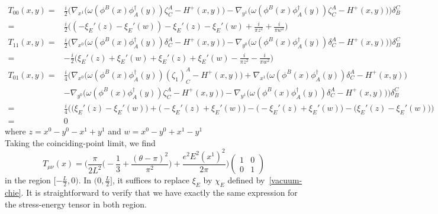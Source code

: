 \begin{equation}\label{vacuum-stressenergy}
\begin{split}
T_{00}(x,y) = 
& \frac{i}{2}\Big(\nabla_{x^1} \big( \omega(\phi^B(x) \phi^\dagger_A(y))\zeta^A_C - H^+(x,y) \big)
- \nabla_{y^1} \big( \omega( \phi^B(x) \phi^\dagger_A(y))\zeta^A_C - H^+(x,y) \big)
\Big)\delta_B^C  \\
= & \frac{i}{2} \big( (-\xi_E'(z) - \xi_E'(w)) - \xi_E'(z) - \xi_E'(w) + \frac{i}{\pi z^2} + \frac{i}{\pi w^2} \big)   \\
T_{11}(x,y) =
& \frac{i}{2}\Big(\nabla_{x^0} \big( \omega(\phi^B(x) \phi^\dagger_A(y))\delta^A_C - H^+(x,y) \big)
- \nabla_{y^0} \big( \omega( \phi^B(x) \phi^\dagger_A(y))\delta^A_C - H^+(x,y) \big)
\Big)\delta_B^C  \\
= & - \frac{i}{2}\big( \xi_E'(z) + \xi_E'(w) + \xi_E'(z) + \xi_E'(w) - \frac{i}{\pi z^2} - \frac{i}{\pi w^2}\big) \\
T_{01}(x,y) = 
& \frac{i}{4}\Big(\nabla_{x^0} \big( \omega(\phi^B(x) \phi^\dagger_A(y))(\zeta_1)^A_C - H^+(x,y) \big) + \nabla_{x^1} \big( \omega(\phi^B(x) \phi^\dagger_A(y))\delta^A_C - H^+(x,y) \big)  \\
& - \nabla_{y^0} \big( \omega( \phi^B(x) \phi^\dagger_A(y))\zeta^A_C - H^+(x,y) \big)
- \nabla_{y^1} \big( \omega( \phi^B(x) \phi^\dagger_A(y))\delta^A_C - H^+(x,y) \big)
\Big)\delta_B^C \\
= & \frac{i}{4}\Big( \big( \xi_E'(z) - \xi_E'(w) \big) + \big(- \xi_E'(z) + \xi_E'(w) \big) - \big( - \xi_E'(z) + \xi_E'(w) \big) - \big( \xi_E'(z) - \xi_E'(w) \big) \Big) \\
= & 0
\end{split}
\end{equation}
where $z = x^0 - y^0 - x^1 + y^1$ and $w = x^0 - y^0 + x^1 - y^1$ \\
Taking the coinciding-point limit, we find
\begin{equation}\label{vacuum-T-with-field}
T_{\mu\nu}(x) = 
\bigg( \frac{\pi}{2L^2}\big( -\frac{1}{3} + \frac{(\theta - \pi)^2}{\pi^2}\big) + \frac{e^2E^2(x^1)^2}{2 \pi} \bigg)
\begin{pmatrix}
1 & 0 \\ 0 & 1
\end{pmatrix}
\end{equation}
in the region $[-\frac L 2, 0)$.
In $(0, \frac L 2 ]$, 
it suffices to replace $\xi_E$ by $\chi_E$ defined by~\cref{vacuum-chie}.
It is straightforward to verify that we have exactly the same expression for the stress-energy tensor in both region.
